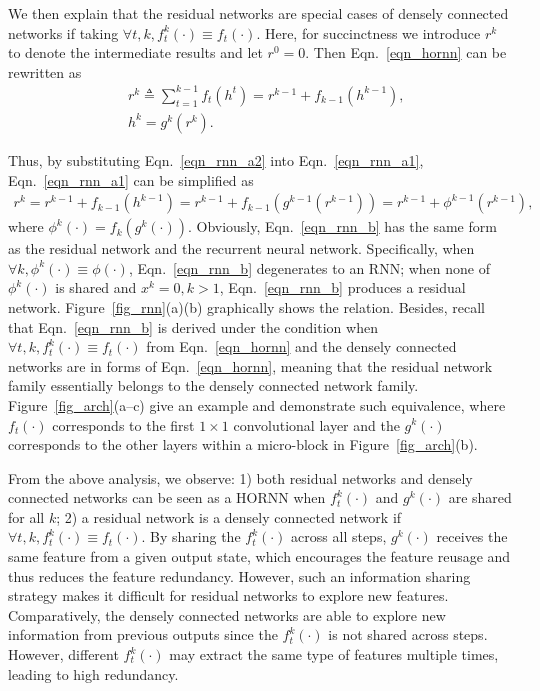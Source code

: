 \documentclass{article}
\begin{document}
We then explain that the residual networks are special cases of densely connected networks if taking $\forall t,k, f_t^k(\cdot) \equiv f_t(\cdot)$. Here, for succinctness we introduce $r^{k}$ to denote the intermediate results and let $r^{0}=0$. Then Eqn.~\eqref{eqn_hornn} can be rewritten as
\begin{align} 
\label{eqn_rnn_a1}
& r^{k} \triangleq \sum\limits_{t=1}^{k-1} f_t(h^t) = r^{k-1} + f_{k-1}(h^{k-1}) \text{,} \\
\label{eqn_rnn_a2}
& h^k = g^k \left( r^{k} \right)  \text{.}
\end{align} 
\vskip -0.05in


Thus, by substituting Eqn.~\eqref{eqn_rnn_a2} into Eqn.~\eqref{eqn_rnn_a1}, Eqn.~\eqref{eqn_rnn_a1} can be simplified as
\vskip -0.1in
\begin{equation} 
\label{eqn_rnn_b}
\begin{aligned}
r^{k} = r^{k-1} + f_{k-1}(h^{k-1}) = r^{k-1} + f_{k-1}(g^{k-1} \left( r^{k-1} \right)) = r^{k-1} + \phi^{k-1}(r^{k-1})
\text{,}
\end{aligned}
\end{equation}
where $\phi^{k}(\cdot)=f_{k}(g^{k}(\cdot))$. Obviously, Eqn.~\eqref{eqn_rnn_b} has the same form as the residual network and the recurrent neural network. Specifically, when $\forall k, \phi^{k}(\cdot) \equiv \phi(\cdot)$, Eqn.~\eqref{eqn_rnn_b} degenerates to an RNN; when none of $\phi^{k}(\cdot)$ is shared and $x^k=0, k>1$, Eqn.~\eqref{eqn_rnn_b} produces a residual network. Figure~\ref{fig_rnn}(a)(b) graphically shows the relation. Besides, recall that Eqn.~\eqref{eqn_rnn_b} is derived under the condition when $\forall t,k, f_t^k(\cdot) \equiv f_t(\cdot)$ from Eqn.~\eqref{eqn_hornn} and the densely connected networks are in forms of Eqn.~\eqref{eqn_hornn}, meaning that the residual network family essentially belongs to the densely connected network family. Figure~\ref{fig_arch}(a--c) give an example and demonstrate such equivalence, where $f_t(\cdot)$ corresponds to the first $1\times1$ convolutional layer and the $g^k(\cdot)$ corresponds to the other layers within a micro-block in Figure~\ref{fig_arch}(b).


\vskip -0.03in
\label{sec_discussion}
From the above analysis, we observe: 1) both residual networks and densely connected networks can be seen as a HORNN when $f_t^k(\cdot)$ and $g^k(\cdot)$ are shared for all $k$; 2) a residual network is a densely connected network if $\forall t,k, f_t^k(\cdot) \equiv f_t(\cdot)$. By sharing the $f_t^k(\cdot)$ across all steps, $g^k(\cdot)$ receives the same feature from a given output state, which encourages the feature reusage and thus reduces the feature redundancy. However, such an information sharing strategy makes it difficult for residual networks to explore new features. Comparatively, the densely connected networks are able to explore new information from previous outputs since the $f_t^k(\cdot)$  is not shared across steps. However, different $f_t^k(\cdot)$ may extract the same type of features multiple times, leading to high redundancy.
\end{document}
